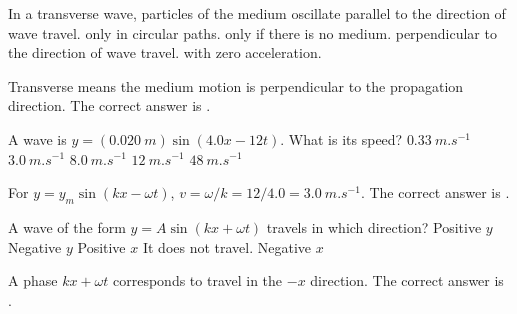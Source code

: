 \documentclass[full,print,11pt,a4paper]{physicsquiz}
\begin{document}
\begin{quizbank}
  \begin{quizquestion}[
    id=ow-wave-013,
    topic=traveling-waves,
    difficulty=foundation,
    marks=1,
    correct=D,
    tags={wave-types},
    outcome={Distinguish transverse and longitudinal waves}
  ]
    In a transverse wave, particles of the medium oscillate
    \choices
      {parallel to the direction of wave travel.}
      {only in circular paths.}
      {only if there is no medium.}
      {perpendicular to the direction of wave travel.}
      {with zero acceleration.}
  \end{quizquestion}
  \begin{quizsolution}
    Transverse means the medium motion is perpendicular to the propagation
    direction. The correct answer is \quizcorrectletter.
  \end{quizsolution}

  \begin{quizquestion}[
    id=ow-wave-014,
    topic=traveling-waves,
    difficulty=applied,
    marks=1,
    correct=B,
    tags={wave-equation,calculation},
    outcome={Extract speed from a sinusoidal wave equation}
  ]
    A wave is \(y=(\SI{0.020}{m})\sin(4.0x-12t)\). What is its speed?
    \choices
      {\(\SI{0.33}{m.s^{-1}}\)}
      {\(\SI{3.0}{m.s^{-1}}\)}
      {\(\SI{8.0}{m.s^{-1}}\)}
      {\(\SI{12}{m.s^{-1}}\)}
      {\(\SI{48}{m.s^{-1}}\)}
  \end{quizquestion}
  \begin{quizsolution}
    For \(y=y_m\sin(kx-\omega t)\), \(v=\omega/k=12/4.0=\SI{3.0}{m.s^{-1}}\).
    The correct answer is \quizcorrectletter.
  \end{quizsolution}

  \begin{quizquestion}[
    id=ow-wave-015,
    topic=traveling-waves,
    difficulty=foundation,
    marks=1,
    correct=E,
    tags={direction,phase},
    outcome={Identify wave direction from phase}
  ]
    A wave of the form \(y=A\sin(kx+\omega t)\) travels in which direction?
    \choices
      {Positive \(y\)}
      {Negative \(y\)}
      {Positive \(x\)}
      {It does not travel.}
      {Negative \(x\)}
  \end{quizquestion}
  \begin{quizsolution}
    A phase \(kx+\omega t\) corresponds to travel in the \(-x\) direction. The
    correct answer is \quizcorrectletter.
  \end{quizsolution}


\end{quizbank}
\end{document}

